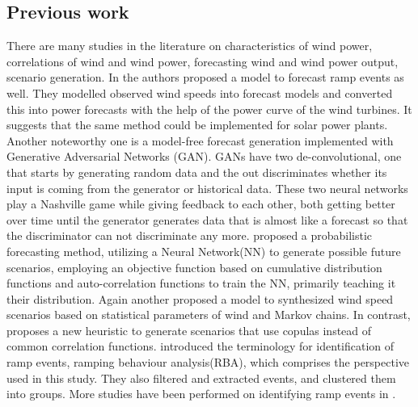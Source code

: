 \subsection{Previous work} \label{previous work}

There are many studies in the literature on characteristics of wind power, correlations of wind and wind power, forecasting wind and wind power output, scenario generation. In \cite{bianco2016wind} the authors proposed a model to forecast ramp events as well. They modelled observed wind speeds into forecast models and converted this into power forecasts with the help of the power curve of the wind turbines. It suggests that the same method could be implemented for solar power plants. Another noteworthy one is a model-free forecast generation implemented with Generative Adversarial Networks (GAN). GANs have two de-convolutional, one that starts by generating random data and the out discriminates whether its input is coming from the generator or historical data. These two neural networks play a Nashville game while giving feedback to each other, both getting better over time until the generator generates data that is almost like a forecast so that the discriminator can not discriminate any more. \cite{cui2016optimized} proposed a probabilistic forecasting method, utilizing a Neural Network(NN) to generate possible future scenarios, employing an objective function based on cumulative distribution functions and auto-correlation functions to train the NN, primarily teaching it their distribution. Again another \cite{karatepe2013wind} proposed a model to synthesized wind speed scenarios based on statistical parameters of wind and Markov chains. In contrast, \cite{kaut2014copula} proposes a new heuristic to generate scenarios that use copulas instead of common correlation functions. \cite{ArticleNo1,ArticleNo2} introduced the terminology for identification of ramp events, ramping behaviour analysis(RBA), which comprises the perspective used in this study. They also filtered and extracted events, and clustered them into groups. More studies have been performed on identifying ramp events in \cite{bossavy2013forecasting, bossavy2013novel, cui2016optimized}. 


